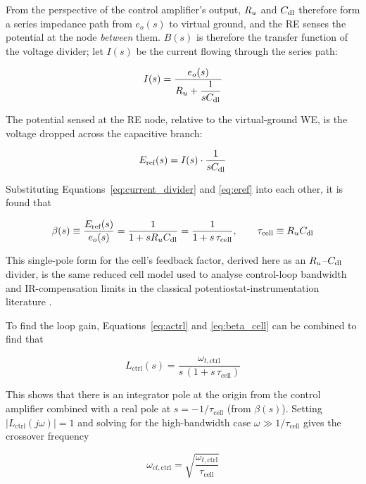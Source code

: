 From the perspective of the control amplifier's output, $R_{u}$ and $C_{\mathrm{dl}}$ therefore form a series impedance path from $e_o(s)$ to virtual ground, and the RE senses the potential at the node \emph{between} them. $B(s)$ is therefore the transfer function of the voltage divider; let $I(s)$ be the current flowing through the series path:
 
\begin{equation}
I(s) = \frac{e_o(s)}{R_{u} + \dfrac{1}{sC_{\mathrm{dl}}}}
\label{eq:current_divider}
\end{equation}
 
The potential sensed at the RE node, relative to the virtual-ground WE, is the voltage dropped across the capacitive branch:
 
\begin{equation}
E_{\text{ref}}(s) = I(s) \cdot \frac{1}{sC_{\mathrm{dl}}}
\label{eq:eref}
\end{equation}
 
Substituting Equations~\eqref{eq:current_divider} and \eqref{eq:eref} into each other, it is found that
 
\begin{equation}
\beta(s) \equiv \frac{E_{\text{ref}}(s)}{e_o(s)} = \frac{1}{1+sR_{u}C_{\mathrm{dl}}} = \frac{1}{1+s\,\tau_{\text{cell}}}, \qquad \tau_{\text{cell}} \equiv R_{u}C_{\mathrm{dl}}
\label{eq:beta_cell}
\end{equation}
 
This single-pole form for the cell's feedback factor, derived here as an $R_{u}$--$C_{\mathrm{dl}}$ divider, is the same reduced cell model used to analyse control-loop bandwidth and IR-compensation limits in the classical potentiostat-instrumentation literature \cite{c5,c7,c8}.
 
To find the loop gain, Equations~\eqref{eq:actrl} and \eqref{eq:beta_cell} can be combined to find that
 
\begin{equation}
L_{\text{ctrl}}(s) = \frac{\omega_{t,\text{ctrl}}}{s\,(1+s\,\tau_{\text{cell}})}
\label{eq:lctrl}
\end{equation}
 
This shows that there is an integrator pole at the origin from the control amplifier combined with a real pole at $s = -1/\tau_{\text{cell}}$ (from $\beta(s)$). Setting $|L_{\text{ctrl}}(j\omega)| = 1$ and solving for the high-bandwidth case $\omega \gg 1/\tau_{\text{cell}}$ gives the crossover frequency
 
\begin{equation}
\omega_{cl,\text{ctrl}} = \sqrt{\frac{\omega_{t,\text{ctrl}}}{\tau_{\text{cell}}}}
\label{eq:wcl_ctrl}
\end{equation}
 
